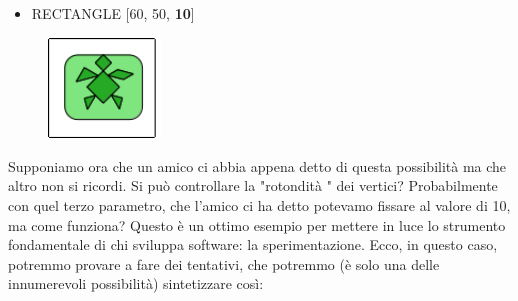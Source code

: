 \begin{scriptsize}
\begin{minipage}{0.40\textwidth}
\begin{itemize}[itemsep=-3pt,parsep=2pt]
\item[] RECTANGLE [60, 50, \textbf{10}]
\end{itemize}
\end{minipage}
\end{scriptsize}
\begin{minipage}{0.4\textwidth}
\begin{figure}[H]
   \includegraphics[width=3.0cm,trim=4 4 8 4,clip]{./images/disegnare/disegnare-25.png}
   \label{dis-24}
\end{figure}
\end{minipage} \hfill

\vskip 1cm

Supponiamo ora che un amico ci abbia appena detto di questa possibilità ma che altro non si ricordi. Si può controllare la  "rotondità " dei vertici? Probabilmente con quel terzo parametro, che l'amico ci ha detto potevamo fissare al valore di 10, ma come funziona? Questo è un ottimo esempio per mettere in luce lo strumento fondamentale di chi sviluppa software: la sperimentazione. Ecco, in questo caso, potremmo provare a fare dei tentativi, che potremmo (è solo una delle innumerevoli possibilità) sintetizzare così:

\vskip 1cm

